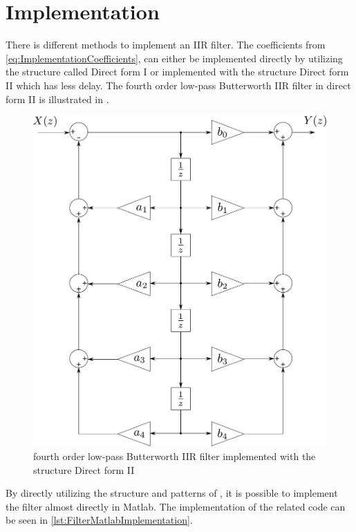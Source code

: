 \section{Implementation}
There is different methods to implement an IIR filter. The coefficients from \eqref{eq:ImplementationCoefficients}, can either be implemented directly by utilizing the structure called Direct form I or implemented with the structure Direct form II which has less delay. The fourth order low-pass Butterworth IIR filter in direct form II is illustrated in .
%
\begin{figure}[H]
	\centering
	\includegraphics[scale=0.4]{figures/IIRfilter.pdf}
	\caption{fourth order low-pass Butterworth IIR filter implemented with the structure Direct form II}
	\label{fig:IIRfilter}
\end{figure}\vspace{-5mm}
%
By directly utilizing the structure and patterns of , it is possible to implement the filter almost directly in Matlab. The implementation of the related code can be seen in \autoref{lst:FilterMatlabImplementation}.
%

